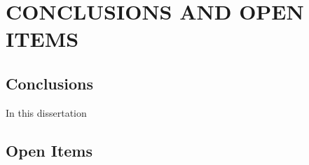 %
%
%
\chapter{\uppercase {Conclusions and Open Items}}



\section{Conclusions}
\label{sec::Conclusions_Conclusions}

In this dissertation

\section{Open Items}
\label{sec::Conclusions_Open_Items}